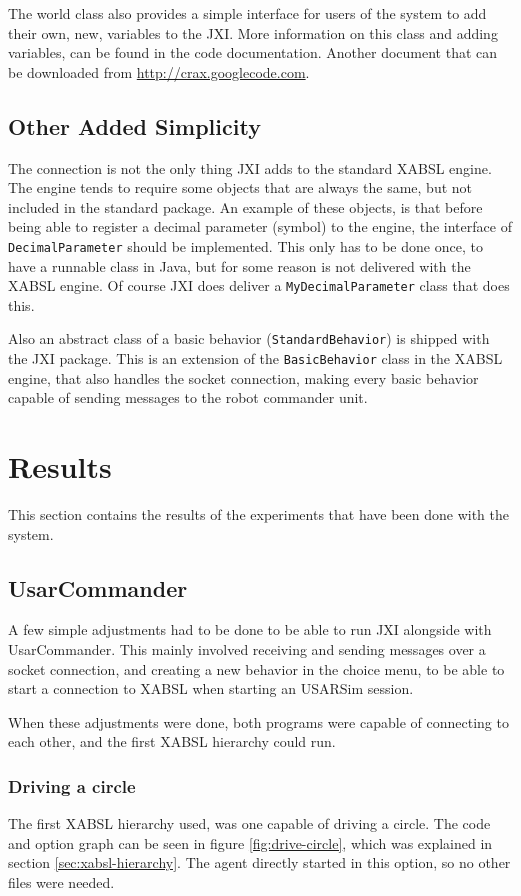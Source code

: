 \documentclass[a4paper,10pt]{article}
\begin{document}
The world class also provides a simple interface for users of the system to add
their own, new, variables to the JXI. More information on this class and adding
variables, can be found in the code documentation. Another document that can be
downloaded from \url{http://crax.googlecode.com}.

\subsection{Other Added Simplicity}
The connection is not the only thing JXI adds to the standard XABSL engine. The
engine tends to require some objects that are always the same, but not included
in the standard package. An example of
these objects, is that before being able to register a decimal parameter
(symbol) to the engine, the interface of \texttt{DecimalParameter} should be
implemented. This only has to be done once, to have a runnable class in Java,
but for some reason is not delivered with the XABSL engine. Of course JXI does
deliver a \texttt{MyDecimalParameter} class that does this.

Also an abstract class of a basic behavior (\texttt{StandardBehavior}) is
shipped with the JXI package. This is an extension of the \texttt{BasicBehavior}
class in the XABSL engine, that also handles the socket connection, making every
basic behavior capable of sending messages to the robot commander unit.

\section{Results}
This section contains the results of the experiments that have been done with
the system. 
\subsection{UsarCommander}
A few simple adjustments had to be done to be able to run JXI alongside with
UsarCommander. This mainly involved receiving and sending messages over a socket
connection, and creating a new behavior in the choice menu, to be able to start
a connection to XABSL when starting an USARSim session. 

When these adjustments were done, both programs were capable of connecting to
each other, and the first XABSL hierarchy could run. 

\subsubsection{Driving a circle}
The first XABSL hierarchy used, was one capable of driving a circle. The code
and option graph can be seen in figure \ref{fig:drive-circle}, which was
explained in section \ref{sec:xabsl-hierarchy}. The agent directly started in
this option, so no other files were needed. 
\end{document}
